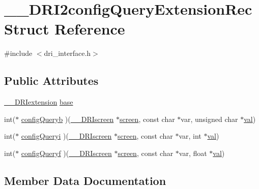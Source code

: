 \hypertarget{struct_____d_r_i2config_query_extension_rec}{}\section{\+\_\+\+\_\+\+D\+R\+I2config\+Query\+Extension\+Rec Struct Reference}
\label{struct_____d_r_i2config_query_extension_rec}


{\ttfamily \#include $<$dri\+\_\+interface.\+h$>$}

\subsection*{Public Attributes}
\begin{DoxyCompactItemize}
\item 
\hyperlink{dri__interface_8h_a4e0a61c8ece00d2b2c6792a9a1b55385}{\+\_\+\+\_\+\+D\+R\+Iextension} \hyperlink{struct_____d_r_i2config_query_extension_rec_a1034a62a113739a223fd6d57a5294564}{base}
\item 
int($\ast$ \hyperlink{struct_____d_r_i2config_query_extension_rec_aad25692d89079390531ec18a3ec1d954}{config\+Queryb} )(\hyperlink{dri__interface_8h_a9961b01d421ee1fd6ed3c05acc9ca561}{\+\_\+\+\_\+\+D\+R\+Iscreen} $\ast$\hyperlink{cad_8h_ae04e09e4e3831bfc1632c509ae37dcec}{screen}, const char $\ast$var, unsigned char $\ast$\hyperlink{glcorearb_8h_a26942fd2ed566ef553eae82d2c109c8f}{val})
\item 
int($\ast$ \hyperlink{struct_____d_r_i2config_query_extension_rec_ac38edb5fe4f517fb1b391d349c0ec4f6}{config\+Queryi} )(\hyperlink{dri__interface_8h_a9961b01d421ee1fd6ed3c05acc9ca561}{\+\_\+\+\_\+\+D\+R\+Iscreen} $\ast$\hyperlink{cad_8h_ae04e09e4e3831bfc1632c509ae37dcec}{screen}, const char $\ast$var, int $\ast$\hyperlink{glcorearb_8h_a26942fd2ed566ef553eae82d2c109c8f}{val})
\item 
int($\ast$ \hyperlink{struct_____d_r_i2config_query_extension_rec_a004f326f142167177768231cca4cd825}{config\+Queryf} )(\hyperlink{dri__interface_8h_a9961b01d421ee1fd6ed3c05acc9ca561}{\+\_\+\+\_\+\+D\+R\+Iscreen} $\ast$\hyperlink{cad_8h_ae04e09e4e3831bfc1632c509ae37dcec}{screen}, const char $\ast$var, float $\ast$\hyperlink{glcorearb_8h_a26942fd2ed566ef553eae82d2c109c8f}{val})
\end{DoxyCompactItemize}


\subsection{Member Data Documentation}
\mbox{\label{struct_____d_r_i2config_query_extension_rec_a1034a62a113739a223fd6d57a5294564}} 
